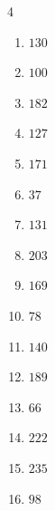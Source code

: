 \begin{multicols}{4}
\begin{enumerate}
  \item $130$


  \item $100$


  \item $182$


  \item $127$


  \item $171$


  \item $37$


\columnbreak %

  \item $131$


  \item $203$


  \item $169$


  \item $78$


  \item $140$


  \item $189$


  \item $66$


  \item $222$


  \item $235$


  \item $98$


\end{enumerate}
\end{multicols}

